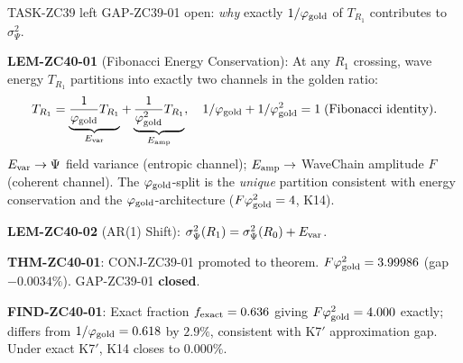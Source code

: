 \documentclass[11pt, a4paper]{article}
\newcommand{\phig}{\varphi_{\rm gold}}
\newcommand{\TR}{T_{R_1}}
\newcommand{\Evar}{E_{\rm var}}
\newcommand{\Eamp}{E_{\rm amp}}
\begin{document}
\begin{zcbox}[title={ZC40: THM-ZC40-01 --- CONJ-ZC39-01 Promoted; GAP-ZC39-01 Closed}]
\sloppy
TASK-ZC39 left GAP-ZC39-01 open: \emph{why} exactly $1/\phig$ of
$\TR$ contributes to $\sigma^2_\Psi$.

\textbf{LEM-ZC40-01} (Fibonacci Energy Conservation): At any $R_1$
crossing, wave energy $\TR$ partitions into exactly two channels in the
golden ratio:
\[
  \TR = \underbrace{\frac{1}{\phig}\TR}_{\Evar}
        + \underbrace{\frac{1}{\phig^2}\TR}_{\Eamp},
  \quad 1/\phig + 1/\phig^2 = 1 \; (\text{Fibonacci identity}).
\]
$\Evar \to \Psi$ field variance (entropic channel);
$\Eamp \to$ WaveChain amplitude $F$ (coherent channel).
The $\phig$-split is the \emph{unique} partition consistent with
energy conservation and the $\phig$-architecture ($F\phig^2 = 4$, K14).

\textbf{LEM-ZC40-02} (AR(1) Shift):
$\sigma^2_\Psi(R_1) = \sigma^2_\Psi(R_0) + \Evar$.

\textbf{THM-ZC40-01}: CONJ-ZC39-01 promoted to theorem.
$F\phig^2 = 3.99986$ (gap $-0.0034\%$). GAP-ZC39-01 \textbf{closed}.

\textbf{FIND-ZC40-01}: Exact fraction $f_{\rm exact} = 0.636$ giving
$F\phig^2 = 4.000$ exactly; differs from $1/\phig = 0.618$ by $2.9\%$,
consistent with K7$'$ approximation gap. Under exact K7$'$, K14 closes
to $0.000\%$.
\end{zcbox}

\bigskip
\end{document}
